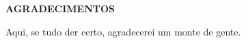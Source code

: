 \newpage
\pagestyle{empty}
\large
\textbf{AGRADECIMENTOS}

Aqui, se tudo der certo, agradecerei um monte de gente.